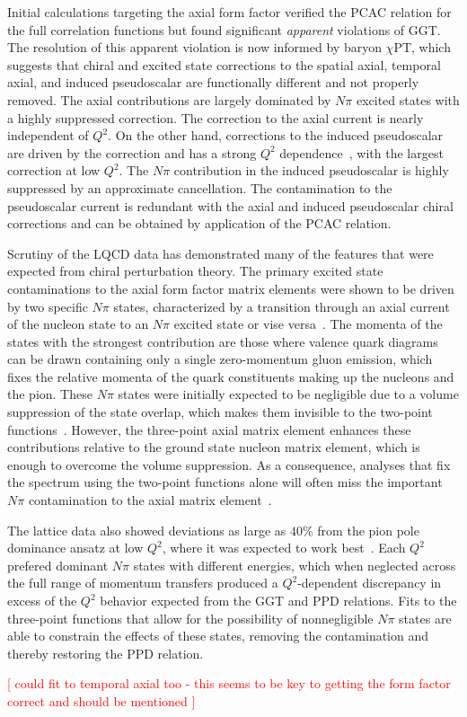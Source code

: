Initial calculations targeting the axial form factor verified the PCAC relation
 for the full correlation functions but found significant \emph{apparent} violations
 of GGT. The resolution of this apparent violation
 is now informed by baryon $\chi$PT, which suggests that chiral
 and excited state corrections to the spatial axial, temporal axial, and induced pseudoscalar
 are functionally different and not properly removed.
The axial contributions are largely dominated by  $N\pi$ excited states
 with a highly suppressed  correction.
The correction to the axial current is nearly independent of $Q^2$.
On the other hand, corrections to the induced pseudoscalar are
 driven by the  correction and has
 a strong $Q^2$ dependence~\cite{Bar:2018xyi}, with the largest correction at low $Q^2$.
The $N\pi$  contribution in the induced pseudoscalar is highly suppressed by
 an approximate cancellation.
The contamination to the pseudoscalar current is redundant with the
 axial and induced pseudoscalar chiral corrections and can be obtained
 by application of the PCAC relation.

Scrutiny of the LQCD data has demonstrated many of the features
 that were expected from chiral perturbation theory.
The primary excited state contaminations to the axial form factor matrix elements
 were shown to be driven by two specific $N\pi$ states,
 characterized by a transition through an axial current
 of the nucleon state to an $N\pi$ excited state or vise versa~\cite{Jang:2019vkm}.
The momenta of the states with the strongest contribution are those
 where valence quark diagrams can be drawn containing only a single
 zero-momentum gluon emission, which fixes the relative momenta of the
 quark constituents making up the nucleons and the pion.
These $N\pi$ states were initially expected to be negligible due to a volume suppression
 of the state overlap, which makes them invisible to the two-point functions~\cite{Bar:2016uoj}.
However, the three-point axial matrix element enhances these contributions relative
 to the ground state nucleon matrix element, which is enough to overcome the volume suppression.
As a consequence, analyses that fix the spectrum using the two-point functions alone
 will often miss the important $N\pi$ contamination to the
 axial matrix element~\cite{Jang:2019vkm,He:2021yvm}.

The lattice data also showed deviations as large as $40\%$ from the pion pole
 dominance ansatz at low $Q^2$, where it was expected to
 work best~\cite{Bali:2014nma,Gupta:2017dwj}.
Each $Q^2$ prefered dominant $N\pi$ states with different energies,
 which when neglected across the full range of momentum transfers
 produced a $Q^2$-dependent discrepancy in excess of the $Q^2$ behavior
 expected from the GGT and PPD relations.
Fits to the three-point functions that allow for the possibility of
 nonnegligible $N\pi$ states are able to constrain the effects of these states,
 removing the contamination and thereby restoring the PPD relation.

\textcolor{red}{[ could fit to temporal axial too
 - this seems to be key to getting the form factor correct and should be mentioned ]}


